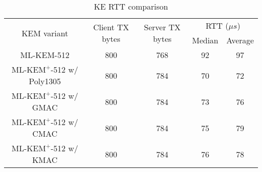 \documentclass[journal=tches,submission]{iacrtrans}
\newcommand{\us}{\mu s}
\def\mlkemplus{\text{ML-KEM}^+}
\begin{document}
\begin{table}[h]
    \centering
    \footnotesize
    \caption{KE RTT comparison}\label{tbl:ke-rtt}

    \begin{tabular}{|c|c|c|c|c|}
        \hline
        \multirow{2}{*}{KEM variant}
        & \multirow{2}{*}{Client TX bytes}
        & \multirow{2}{*}{Server TX bytes}
        & \multicolumn{2}{|c|}{RTT ($\us$)} \\
        \cline{4-5}
        & & & Median & Average \\
        \hline
        ML-KEM-512 & 800 & 768 & 92 & 97 \\
        \hline
        $\mlkemplus$-512 w/ Poly1305 & 800 & 784 & 70 & 72 \\
        \hline
        $\mlkemplus$-512 w/ GMAC & 800 & 784 & 73 & 76 \\
        \hline
        $\mlkemplus$-512 w/ CMAC & 800 & 784 & 75 & 79 \\
        \hline
        $\mlkemplus$-512 w/ KMAC & 800 & 784 & 76 & 78 \\
        \hline
    \end{tabular}\vspace{0.3cm}

\end{table}
\end{document}
